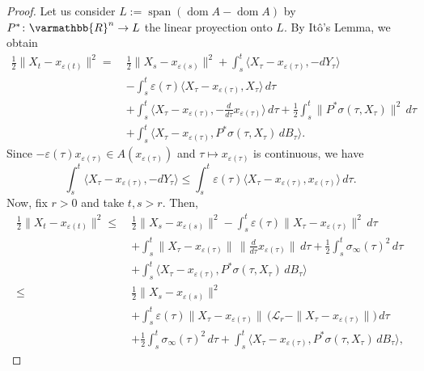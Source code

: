\documentclass[11pt,reqno]{article}
\let\mathbb=\varmathbb
\newcommand{\R}{\mathbb{R}}
\newcommand{\dom}{\operatorname{dom}}
\renewcommand{\epsilon}{\varepsilon}
\newcommand{\1}{\mathds{1}}
\numberwithin{equation}{section}  %
\theoremstyle{plain}
\theoremstyle{definition}
\theoremstyle{remark}
\numberwithin{theorem}{section}
\numberwithin{remark}{section}
\numberwithin{example}{section}
\begin{document}
\begin{proof} 
Let us consider  $L:=\operatorname{span}(\dom A  - \dom A)$  by $P^\ast \colon \R^n \to L$ the linear proyection onto $L$. By Itô's Lemma, we obtain
	\begin{equation*}
		\begin{aligned}
			\frac{1}{2}\|X_t-x_{\epsilon(t)}\|^2
			= \ &\frac{1}{2}\|X_s-x_{\epsilon(s)}\|^2 
			+ \int_s^t \langle X_\tau-x_{\epsilon(\tau)},-dY_\tau\rangle \\
			&- \int_s^t \epsilon(\tau)\langle X_\tau-x_{\epsilon(\tau)},X_\tau\rangle \,d\tau \\
			&+ \int_s^t \langle X_\tau-x_{\epsilon(\tau)},-\frac{d}{d\tau}x_{\epsilon(\tau)}\rangle\, d\tau 
			+ \frac{1}{2}\int_s^t \|P^\ast\sigma(\tau,X_\tau)\|^2 \, d\tau \\
			&+ \int_s^t \langle X_\tau-x_{\epsilon(\tau)},P^\ast\sigma(\tau,X_\tau)\, dB_\tau \rangle.
		\end{aligned}
	\end{equation*}
	Since $-\epsilon(\tau)x_{\epsilon(\tau)}\in A(x_{\epsilon(\tau)})$ and $\tau\mapsto x_{\epsilon(\tau)}$ is continuous, we have
	\begin{equation*}
		\int_s^t \langle X_\tau-x_{\epsilon(\tau)},-dY_\tau\rangle
		\leq \int_s^t \epsilon(\tau)\langle X_\tau-x_{\epsilon(\tau)},x_{\epsilon(\tau)}\rangle \, d\tau.
	\end{equation*}
	Now, fix $r >0$ and take $t,s >r$. Then,
	\begin{equation*}
		\begin{aligned}
			\frac{1}{2}\|X_t-x_{\epsilon(t)}\|^2
			\leq \ &\frac{1}{2}\|X_s-x_{\epsilon(s)}\|^2 
			-\int_s^t \epsilon(\tau)\|X_\tau-x_{\epsilon(\tau)}\|^2 \, d\tau \\
			&+ \int_s^t \|X_\tau-x_{\epsilon(\tau)}\|\,
			\Big\|\frac{d}{d\tau}x_{\epsilon(\tau)}\Big\| \, d\tau
			+ \frac{1}{2}\int_s^t \sigma_\infty(\tau)^2 \, d\tau \\
			&+ \int_s^t \langle X_\tau-x_{\epsilon(\tau)},P^\ast\sigma(\tau,X_\tau)\, dB_\tau \rangle \\
			\leq \ &\frac{1}{2}\|X_s-x_{\epsilon(s)}\|^2 \\
			&+ \int_s^t \epsilon(\tau)\|X_\tau-x_{\epsilon(\tau)}\|\,
			\big(\mathcal{L}_{r}-\|X_\tau-x_{\epsilon(\tau)}\|\big) \, d\tau \\
			&+ \frac{1}{2}\int_s^t \sigma_\infty(\tau)^2 \, d\tau
			+ \int_s^t \langle X_\tau-x_{\epsilon(\tau)},P^\ast\sigma(\tau,X_\tau)\, dB_\tau \rangle,
		\end{aligned}

\end{equation*}
\end{proof}
\end{document}
